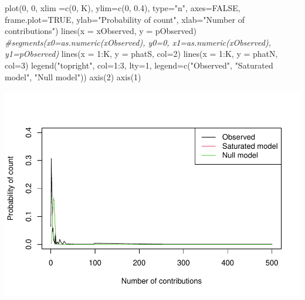 \documentclass[
]{ctexart}
\newenvironment{Shaded}{\begin{snugshade}}{\end{snugshade}}
\newcommand{\AttributeTok}[1]{\textcolor[rgb]{0.77,0.63,0.00}{#1}}
\newcommand{\CommentTok}[1]{\textcolor[rgb]{0.56,0.35,0.01}{\textit{#1}}}
\newcommand{\ConstantTok}[1]{\textcolor[rgb]{0.00,0.00,0.00}{#1}}
\newcommand{\DecValTok}[1]{\textcolor[rgb]{0.00,0.00,0.81}{#1}}
\newcommand{\FloatTok}[1]{\textcolor[rgb]{0.00,0.00,0.81}{#1}}
\newcommand{\FunctionTok}[1]{\textcolor[rgb]{0.00,0.00,0.00}{#1}}
\newcommand{\NormalTok}[1]{#1}
\newcommand{\SpecialCharTok}[1]{\textcolor[rgb]{0.00,0.00,0.00}{#1}}
\newcommand{\StringTok}[1]{\textcolor[rgb]{0.31,0.60,0.02}{#1}}
\begin{document}
\begin{Shaded}
\begin{Highlighting}[]
\FunctionTok{plot}\NormalTok{(}\DecValTok{0}\NormalTok{, }\DecValTok{0}\NormalTok{, }\AttributeTok{xlim =}\FunctionTok{c}\NormalTok{(}\DecValTok{0}\NormalTok{, K), }\AttributeTok{ylim=}\FunctionTok{c}\NormalTok{(}\DecValTok{0}\NormalTok{, }\FloatTok{0.4}\NormalTok{), }\AttributeTok{type=}\StringTok{"n"}\NormalTok{, }\AttributeTok{axes=}\ConstantTok{FALSE}\NormalTok{, }\AttributeTok{frame.plot=}\ConstantTok{TRUE}\NormalTok{,}
    \AttributeTok{ylab=}\StringTok{"Probability of count"}\NormalTok{, }\AttributeTok{xlab=}\StringTok{"Number of contributions"}\NormalTok{)}
\FunctionTok{lines}\NormalTok{(}\AttributeTok{x =}\NormalTok{ xObserved, }\AttributeTok{y =}\NormalTok{ pObserved)}
\CommentTok{\#segments(x0=as.numeric(xObserved), y0=0, x1=as.numeric(xObserved), y1=pObserved)}
\FunctionTok{lines}\NormalTok{(}\AttributeTok{x =} \DecValTok{1}\SpecialCharTok{:}\NormalTok{K, }\AttributeTok{y =}\NormalTok{ phatS, }\AttributeTok{col=}\DecValTok{2}\NormalTok{)}
\FunctionTok{lines}\NormalTok{(}\AttributeTok{x =} \DecValTok{1}\SpecialCharTok{:}\NormalTok{K, }\AttributeTok{y =}\NormalTok{ phatN, }\AttributeTok{col=}\DecValTok{3}\NormalTok{)}
\FunctionTok{legend}\NormalTok{(}\StringTok{"topright"}\NormalTok{, }\AttributeTok{col=}\DecValTok{1}\SpecialCharTok{:}\DecValTok{3}\NormalTok{, }\AttributeTok{lty=}\DecValTok{1}\NormalTok{, }\AttributeTok{legend=}\FunctionTok{c}\NormalTok{(}\StringTok{"Observed"}\NormalTok{, }\StringTok{"Saturated model"}\NormalTok{, }\StringTok{"Null model"}\NormalTok{))}
\FunctionTok{axis}\NormalTok{(}\DecValTok{2}\NormalTok{)}
\FunctionTok{axis}\NormalTok{(}\DecValTok{1}\NormalTok{)}
\end{Highlighting}
\end{Shaded}

\includegraphics{hwk05_files/figure-latex/unnamed-chunk-6-1.pdf}
\end{document}
